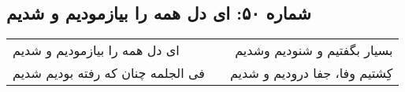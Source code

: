 \begin{center}
\section*{شماره ۵۰: ای دل همه را بیازمودیم و شدیم}
\label{sec:050}
\begin{longtable}{l p{0.5cm} r}
ای دل همه را بیازمودیم و شدیم
&&
بسیار بگفتیم و شنودیم وشدیم
\\
فی الجلمه چنان که رفته بودیم شدیم
&&
کِشتیم وفا، جفا درودیم و شدیم
\\
\end{longtable}
\end{center}
